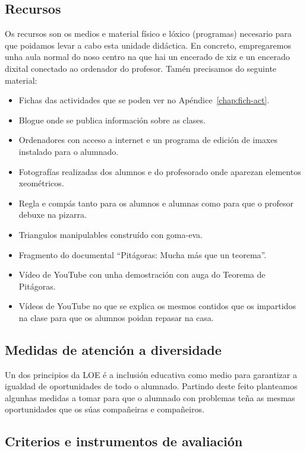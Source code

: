 \subsection{Recursos}
Os recursos son os medios e material físico e lóxico (programas) necesario para que poidamos levar a cabo esta unidade didáctica. En concreto, empregaremos unha aula normal do noso centro na que hai un encerado de xiz e un encerado dixital conectado ao ordenador do profesor. Tamén precisamos do seguinte material:
\begin{itemize}
    \item Fichas das actividades que se poden ver no Apéndice~\ref{chap:fich-act}.
    \item Blogue onde se publica información sobre as clases.
    \item Ordenadores con acceso a internet e un programa de edición de imaxes instalado para o alumnado.
    \item Fotografías realizadas dos alumnos e do profesorado onde aparezan elementos xeométricos.
    \item Regla e compás tanto para os alumnos e alumnas como para que o profesor debuxe na pizarra.
    \item Triangulos manipulables construído con goma-eva.
    \item Fragmento do documental ``Pitágoras: Mucha más que un teorema''.
    \item Vídeo de YouTube con unha demostración con auga do Teorema de Pitágoras.
    \item Vídeos de YouTube no que se explica os mesmos contidos que os impartidos na clase para que os alumnos poidan repasar na casa.
\end{itemize}

\subsection{Medidas de atención a diversidade}

Un dos principios da LOE \cite{lomce} é a inclusión educativa como medio para garantizar a igualdad de oportunidades de todo o alumnado. Partindo deste feito planteamos algunhas medidas a tomar para que o alumnado con problemas teña as mesmas oportunidades que os súas compañeiras e compañeiros.


\subsection{Criterios e instrumentos de avaliación}

